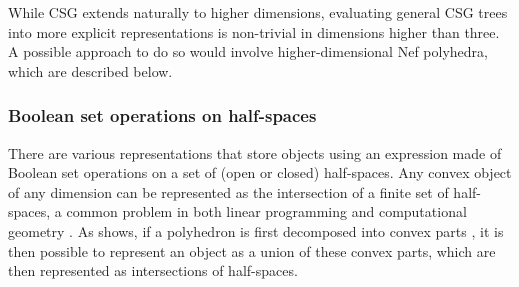 While CSG extends naturally to higher dimensions, evaluating general CSG trees into more explicit representations is non-trivial in dimensions higher than three.
A possible approach to do so would involve higher-dimensional Nef polyhedra, which are described below.

\subsubsection{Boolean set operations on half-spaces}

There are various representations that store objects using an expression made of Boolean set operations on a set of (open or closed) half-spaces.
Any convex object of any dimension can be represented as the intersection of a finite set of half-spaces, a common problem in both linear programming and computational geometry \citep{Shamos76,Preparata79}.
As  shows, if a polyhedron is first decomposed into convex parts \citep{Chazelle79,Bajaj90}, it is then possible to represent an object as a union of these convex parts, which are then represented as intersections of half-spaces.
